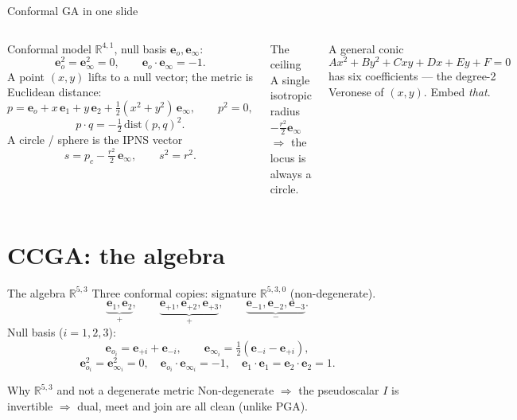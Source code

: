 \documentclass[aspectratio=169, 10pt]{beamer}
\newcommand{\eo}{\mathbf{e}_o}
\newcommand{\einff}{\mathbf{e}_\infty}
\newcommand{\eoi}[1]{\mathbf{e}_{o_{#1}}}
\newcommand{\einfi}[1]{\mathbf{e}_{\infty_{#1}}}
\newcommand{\dotp}{\cdot}
\newcommand{\R}[1]{\mathbb{R}^{#1}}
\newcommand{\pca}{p_c}
\begin{document}
\begin{frame}[t]{Conformal GA in one slide}
  \setlength{\columnsep}{18pt}
  \begin{columns}[T]
      Conformal model $\R{4,1}$, \alert{null basis} $\eo,\einff$:
      \[
        \eo^2=\einff^2=0,\qquad \eo\dotp\einff=-1 .
      \]
      A point $(x,y)$ lifts to a \alert{null vector}; the metric is Euclidean distance:
      \[
        p = \eo + x\,\mathbf{e}_1 + y\,\mathbf{e}_2 + \tfrac12(x^2+y^2)\,\einff,
        \qquad p^2=0,
      \]
      \[
        p\dotp q = -\tfrac12\,\mathrm{dist}(p,q)^2 .
      \]
      A circle / sphere is the \alert{IPNS vector}
      \[
        s = \pca - \tfrac{r^2}{2}\,\einff,\qquad s^2=r^2 .
      \]

      \begin{alertblock}{The ceiling}
        A \alert{single isotropic radius} $-\tfrac{r^2}2\einff$ $\Rightarrow$ the locus is
        always a \alert{circle}.
      \end{alertblock}
      A general conic
      \[
        Ax^2{+}By^2{+}Cxy{+}Dx{+}Ey{+}F=0
      \]
      has \alert{six} coefficients --- the \alert{degree-2 Veronese} of $(x,y)$.
      Embed \emph{that}.
  \end{columns}
\end{frame}

\section{CCGA: the algebra}

\begin{frame}[t]{The algebra $\R{5,3}$}
  Three conformal copies: signature $\R{5,3,0}$ (\alert{non-degenerate}).
  \[
    \underbrace{\mathbf{e}_1,\mathbf{e}_2}_{+},\qquad
    \underbrace{\mathbf{e}_{+1},\mathbf{e}_{+2},\mathbf{e}_{+3}}_{+},\qquad
    \underbrace{\mathbf{e}_{-1},\mathbf{e}_{-2},\mathbf{e}_{-3}}_{-} .
  \]
  \alert{Null basis} ($i=1,2,3$):
  \[
    \eoi{i}=\mathbf{e}_{+i}+\mathbf{e}_{-i},\qquad
    \einfi{i}=\tfrac12(\mathbf{e}_{-i}-\mathbf{e}_{+i}),
  \]
  \[
    \eoi{i}^2=\einfi{i}^2=0,\quad \eoi{i}\dotp\einfi{i}=-1,\quad
    \mathbf{e}_1\dotp\mathbf{e}_1=\mathbf{e}_2\dotp\mathbf{e}_2=1 .
  \]
  \vspace{0.2cm}
  \begin{exampleblock}{Why $\R{5,3}$ and not a degenerate metric}
    Non-degenerate $\Rightarrow$ the pseudoscalar $I$ is invertible $\Rightarrow$
    \alert{dual, meet and join are all clean} (unlike PGA).
  \end{exampleblock}
\end{frame}
\end{document}
